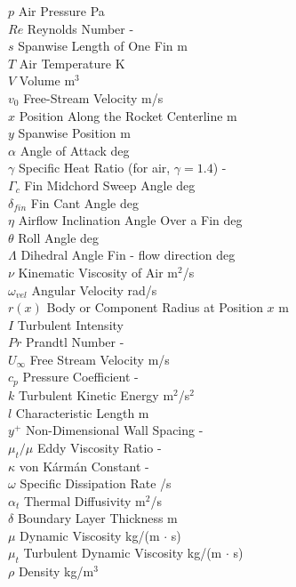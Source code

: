 \begin{tabbing}
    $p$ \> Air Pressure \> Pa \\
    $Re$ \> Reynolds Number \> - \\
    $s$ \> Spanwise Length of One Fin \> m \\
    $T$ \> Air Temperature \> K \\
    $V$ \> Volume \> m$^3$ \\
    $v_0$ \> Free-Stream Velocity \> m/s \\
    $x$ \> Position Along the Rocket Centerline \> m \\
    $y$ \> Spanwise Position \> m \\
    $\alpha$ \> Angle of Attack \> deg \\
    $\gamma$ \> Specific Heat Ratio (for air, $\gamma = 1.4$) \> - \\
    $\Gamma_c$ \> Fin Midchord Sweep Angle \> deg \\
    $\delta_{fin}$ \> Fin Cant Angle \> deg \\
    $\eta$ \> Airflow Inclination Angle Over a Fin \> deg \\
    $\theta$ \> Roll Angle \> deg \\
    $\Lambda$ \> Dihedral Angle Fin - flow direction \> deg \\
    $\nu$ \> Kinematic Viscosity of Air \> m$^2$/s \\
    $\omega_{vel}$ \> Angular Velocity \> rad/s \\
    $r(x)$ \> Body or Component Radius at Position $x$ \> m \\
    $I$ \> Turbulent Intensity \> \\
    $Pr$ \> Prandtl Number \> - \\
    $U_{\infty}$ \> Free Stream Velocity \> m/s \\
    $c_p$ \> Pressure Coefficient \> - \\
    $k$ \> Turbulent Kinetic Energy \> m$^2$/s$^2$ \\
    $l$ \> Characteristic Length \> m \\
    $y^+$ \> Non-Dimensional Wall Spacing \> - \\
    $\mu_t/\mu$ \> Eddy Viscosity Ratio \> - \\
    $\kappa$ \> von Kármán Constant \> - \\
    $\omega$ \> Specific Dissipation Rate /s \\
    $\alpha_t$ \> Thermal Diffusivity \> m$^2$/s \\
    $\delta$ \> Boundary Layer Thickness \> m \\
    $\mu$ \> Dynamic Viscosity \> kg/(m $\cdot$ s) \\
    $\mu_t$ \> Turbulent Dynamic Viscosity \> kg/(m $\cdot$ s) \\
    $\rho$ \> Density \> kg/m$^3$ \\
\end{tabbing}